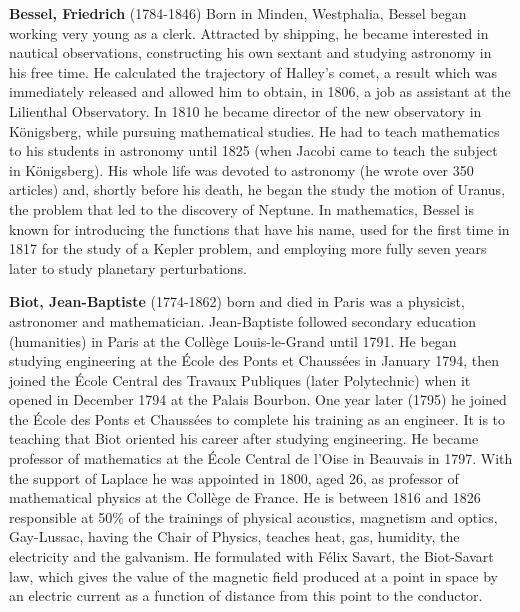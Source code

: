 \textbf{Bessel, Friedrich} (1784-1846) Born in Minden, Westphalia, Bessel began working very young as a clerk. Attracted by shipping, he became interested in nautical observations, constructing his own sextant and studying astronomy in his free time. He calculated the trajectory of Halley's comet, a result which was immediately released and allowed him to obtain, in 1806, a job as assistant at the Lilienthal Observatory. In 1810 he became director of the new observatory in Königsberg, while pursuing mathematical studies. He had to teach mathematics to his students in astronomy until 1825 (when Jacobi came to teach the subject in Königsberg). His whole life was devoted to astronomy (he wrote over 350 articles) and, shortly before his death, he began the study the motion of Uranus, the problem that led to the discovery of Neptune. In mathematics, Bessel is known for introducing the functions that have his name, used for the first time in 1817  for the study of a Kepler problem, and employing more fully seven years later to study planetary perturbations.

\textbf{Biot, Jean-Baptiste} (1774-1862) born and died in Paris was a physicist, astronomer and mathematician. Jean-Baptiste followed secondary education (humanities) in Paris at the Collège Louis-le-Grand until 1791. He began studying engineering at the École des Ponts et Chaussées in January 1794, then joined the École Central des Travaux Publiques (later Polytechnic) when it opened in December 1794 at the Palais Bourbon. One year later (1795) he joined the École des Ponts et Chaussées to complete his training as an engineer. It is to teaching that Biot oriented his career after studying engineering. He became professor of mathematics at the École Central de l'Oise in Beauvais in 1797. With the support of Laplace he was appointed in 1800, aged 26, as professor of mathematical physics at the Collège de France. He is between 1816 and 1826 responsible at 50\% of the trainings of physical acoustics, magnetism and optics, Gay-Lussac, having the Chair of Physics, teaches heat, gas, humidity, the electricity and the galvanism. He formulated with Félix Savart, the Biot-Savart law, which gives the value of the magnetic field produced at a point in space by an electric current as a function of distance from this point to the conductor.


